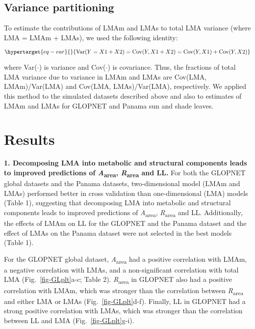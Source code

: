 \documentclass[
  12pt,
  a4paper,
,tablecaptionabove
]{scrartcl}
\begin{document}
\hypertarget{variance-partitioning}{%
\subsection{Variance partitioning}\label{variance-partitioning}}

To estimate the contributions of LMAm and LMAs to total LMA variance
(where LMA = LMAm + LMAs), we used the following identity:

\begin{equation}\protect\hypertarget{eq-var}{}{
\mathrm{Var}(Y = X1 + X2) = \mathrm{Cov}(Y, X1+X2) = \mathrm{Cov}(Y,X1) + \mathrm{Cov}(Y,X2)
}\label{eq-var}\end{equation}

where Var(\(\cdot\)) is variance and Cov(\(\cdot\)) is covariance. Thus,
the fractions of total LMA variance due to variance in LMAm and LMAs are
Cov(LMA, LMAm)/Var(LMA) and Cov(LMA, LMAs)/Var(LMA), respectively. We
applied this method to the simulated datasets described above and also
to estimates of LMAm and LMAs for GLOPNET and Panama sun and shade
leaves.

\hypertarget{results}{%
\section{Results}\label{results}}

\textbf{1. Decomposing LMA into metabolic and structural components
leads to improved predictions of \emph{A}\textsubscript{area},
\emph{R}\textsubscript{area} and LL.} For both the GLOPNET global
datasets and the Panama datasets, two-dimensional model (LMAm and LMAs)
performed better in cross validation than one-dimensional (LMA) models
(Table 1), suggesting that decomposing LMA into metabolic and structural
components leads to improved predictions of
\emph{A}\textsubscript{area}, \emph{R}\textsubscript{area} and LL.
Additionally, the effects of LMAm on LL for the GLOPNET and the Panama
dataset and the effect of LMAs on the Panama dataset were not selected
in the best models (Table 1).

For the GLOPNET global dataset, \emph{A}\textsubscript{area} had a
positive correlation with LMAm, a negative correlation with LMAs, and a
non-significant correlation with total LMA (Fig.~\ref{fig-GLplt}a-c;
Table 2). \emph{R}\textsubscript{area} in GLOPNET also had a positive
correlation with LMAm, which was stronger than the correlation between
\emph{R}\textsubscript{area} and either LMA or LMAs
(Fig.~\ref{fig-GLplt}d-f). Finally, LL in GLOPNET had a strong positive
correlation with LMAs, which was stronger than the correlation between
LL and LMA (Fig.~\ref{fig-GLplt}g-i).
\end{document}
